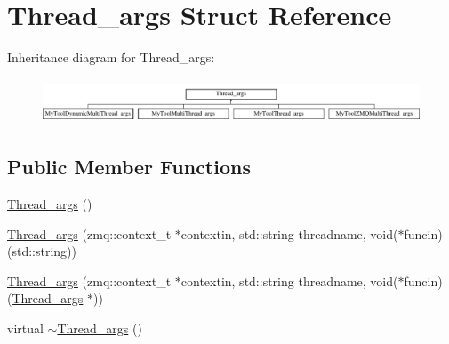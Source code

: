 \hypertarget{structThread__args}{\section{Thread\-\_\-args Struct Reference}
\label{structThread__args}
}
Inheritance diagram for Thread\-\_\-args\-:\begin{figure}[H]
\begin{center}
\leavevmode
\includegraphics[height=1.333333cm]{structThread__args}
\end{center}
\end{figure}
\subsection*{Public Member Functions}
\begin{DoxyCompactItemize}
\item 
\hyperlink{structThread__args_a399b672e0f4f137fe52c141bd8c38eb1}{Thread\-\_\-args} ()
\item 
\hyperlink{structThread__args_a48650ff1135c661a730a5443ccd94f8b}{Thread\-\_\-args} (zmq\-::context\-\_\-t $\ast$contextin, std\-::string threadname, void($\ast$funcin)(std\-::string))
\item 
\hyperlink{structThread__args_af99da074784961f4953bae7e5ff67f33}{Thread\-\_\-args} (zmq\-::context\-\_\-t $\ast$contextin, std\-::string threadname, void($\ast$funcin)(\hyperlink{structThread__args}{Thread\-\_\-args} $\ast$))
\item 
virtual \hyperlink{structThread__args_ad786e0c55b4e44bc04d9ba3b813bace1}{$\sim$\-Thread\-\_\-args} ()
\end{DoxyCompactItemize}
